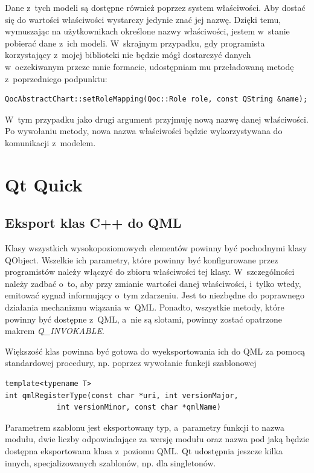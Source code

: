 Dane z~tych modeli są dostępne również poprzez system właściwości. Aby dostać się do wartości właściwości wystarczy jedynie znać jej nazwę. Dzięki temu, wymuszając na użytkownikach określone nazwy właściwości, jestem w~stanie pobierać dane z~ich modeli. W~skrajnym przypadku, gdy programista korzystający z~mojej biblioteki nie będzie mógł dostarczyć danych w~oczekiwanym przeze mnie formacie, udostępniam mu przeładowaną metodę z~poprzedniego podpunktu:

\begin{verbatim}
QocAbstractChart::setRoleMapping(Qoc::Role role, const QString &name);
\end{verbatim}

W~tym przypadku jako drugi argument przyjmuję nową nazwę danej właściwości. Po wywołaniu metody, nowa nazwa właściwości będzie wykorzystywana do komunikacji z~modelem.


\section{Qt Quick}

\subsection{Eksport klas C++ do QML}
Klasy wszystkich wysokopoziomowych elementów powinny być pochodnymi klasy QObject. Wszelkie ich parametry, które powinny być konfigurowane przez programistów należy włączyć do zbioru właściwości tej klasy. W~szczególności należy zadbać o~to, aby przy zmianie wartości danej właściwości, i~tylko wtedy, emitować sygnał informujący o~tym zdarzeniu. Jest to niezbędne do poprawnego działania mechanizmu wiązania w~QML. Ponadto, wszystkie metody, które powinny być dostępne z~QML, a~nie są slotami, powinny zostać opatrzone makrem \textit{Q\_INVOKABLE}.

Większość klas powinna być gotowa do wyeksportowania ich do QML za pomocą standardowej procedury, np. poprzez wywołanie funkcji szablonowej
\begin{verbatim}
template<typename T>
int qmlRegisterType(const char *uri, int versionMajor, 
		    int versionMinor, const char *qmlName)
\end{verbatim}
Parametrem szablonu jest eksportowany typ, a~parametry funkcji to nazwa modułu, dwie liczby odpowiadające za wersję modułu oraz nazwa pod jaką będzie dostępna eksportowana klasa z~poziomu QML. Qt udostępnia jeszcze kilka innych, specjalizowanych szablonów, np. dla singletonów.

